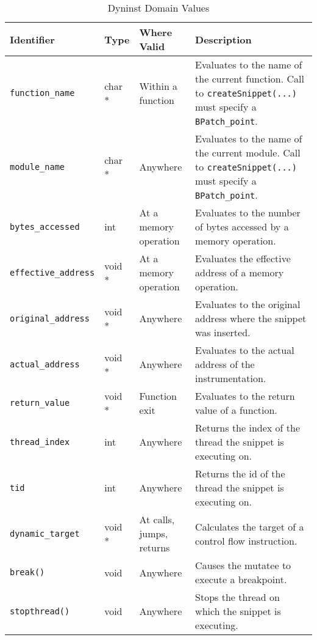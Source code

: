\documentclass{article}
\begin{document}
\begin{table}[!th]
\begin{tabular}{ | l | l | p{4cm} | p{6.5cm} |}
\hline
Identifier & Type & Where Valid & Description\\
\hline
\verb!function_name! & char * & Within a function & Evaluates to the name of the current function. Call to \verb!createSnippet(...)! must specify a \verb!BPatch_point!.\\
\hline
\verb!module_name! & char * & Anywhere & Evaluates to the name of the current module. Call to \verb!createSnippet(...)! must specify a \verb!BPatch_point!.\\
\hline
\verb!bytes_accessed! & int & At a memory operation & Evaluates to the number of bytes accessed by a memory operation.\\  
\hline
\verb!effective_address! & void * & At a memory operation & Evaluates the effective address of a memory operation.\\
\hline
\verb!original_address! & void * & Anywhere & Evaluates to the original address where the snippet was inserted. \\
\hline
\verb!actual_address! & void * & Anywhere & Evaluates to the actual address of the instrumentation. \\
\hline
\verb!return_value! & void * & Function exit & Evaluates to the return value of a function.\\ 
\hline
\verb!thread_index! & int & Anywhere &  Returns the index of the thread the snippet is executing on.\\
\hline
\verb!tid! & int & Anywhere & Returns the id of the thread the snippet is executing on.\\
\hline
\verb!dynamic_target! & void * & At calls, jumps, returns & Calculates the target of a control flow instruction.\\ 
\hline
\verb!break()! & void & Anywhere & Causes the mutatee to execute a breakpoint.\\
\hline
\verb!stopthread()! & void & Anywhere & Stops the thread on which the snippet is executing.\\
\hline

\end{tabular}
\caption{Dyninst Domain Values}
\end{table}
\end{document}
